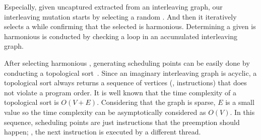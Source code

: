 Especially, given uncaptured \segments extracted from an interleaving
graph, our interleaving mutation starts by selecting a random
\segment.
%
And then it iteratively selects a \segment while confirming that the
selected \segment is harmonious.
%
Determining a given \segment is harmonious is conducted by checking a
loop in an accumulated interleaving graph.



%
After selecting harmonious \segments, generating scheduling points can
be easily done by conducting a topological
sort~\cite{topologicalsort}.
%
Since an imaginary interleaving graph is acyclic, a topological sort
always returns a sequence of vertices (\ie, instructions) that does
not violate a program order.
%
It is well known that the time complexity of a topological sort is
$O(V+E)$. Considering that the graph is sparse, $E$ is a small value
so the time complexity can be asymptotically considered as $O(V)$.
%
In this sequence, scheduling points are just instructions that the
preemption should happen; \ie, the next instruction is executed by a
different thread.
%



